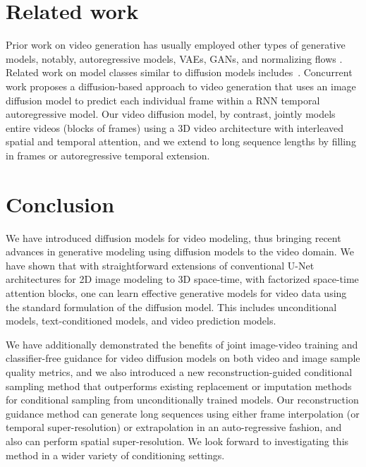 \section{Related work}

Prior work on video generation has usually employed other types of generative models, notably, autoregressive models, VAEs, GANs, and normalizing flows \citep[e.g.][]{babaeizadeh2017stochastic,babaeizadeh2021fitvid,lee2018stochastic,kumar2019videoflow,clark2019adversarial,weissenborn2019scaling,yan2021videogpt,walker2021predicting}. Related work on model classes similar to diffusion models includes~\citep{kadkhodaie2020solving,kadkhodaie2021stochastic}. Concurrent work \citep{yang2022diffusion} proposes a diffusion-based approach to video generation that uses an image diffusion model to predict each individual frame within a RNN temporal autoregressive model. Our video diffusion model, by contrast, jointly models entire videos (blocks of frames) using a 3D video architecture with interleaved spatial and temporal attention, and we extend to long sequence lengths by filling in frames or autoregressive temporal extension.

\section{Conclusion}
\label{sec:conclusion}

We have introduced diffusion models for video modeling, thus bringing recent advances in generative modeling using diffusion models to the video domain. We have shown that with straightforward extensions of conventional U-Net architectures for 2D image modeling to 3D space-time, with factorized space-time attention blocks, one can learn effective generative models for video data using the standard formulation of the diffusion model. This includes unconditional models, text-conditioned models, and video prediction models.

We have additionally demonstrated the benefits of joint image-video training and classifier-free guidance for video diffusion models on both video and image sample quality metrics, and we also introduced a new reconstruction-guided conditional sampling method that outperforms existing replacement or imputation methods for conditional sampling from unconditionally trained models. Our reconstruction guidance method can generate long sequences using either frame interpolation (or temporal super-resolution) or extrapolation in an auto-regressive fashion, and also can perform spatial super-resolution. We look forward to investigating this method in a wider variety of conditioning settings.

